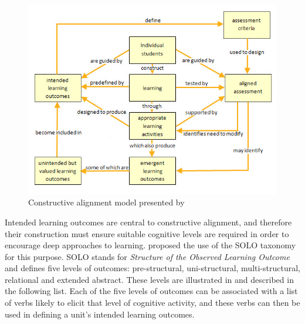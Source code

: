 \begin{figure}[htpb]
	\centering 
	\includegraphics[width=\columnwidth]{Houghton_constructive_alignment_1}
	\caption{Constructive alignment model presented by \citet{Houghton:2004}}
	\label{fig:Houghton}
\end{figure}

Intended learning outcomes are central to constructive alignment, and therefore their construction must ensure suitable cognitive levels are required in order to encourage deep approaches to learning. \citet{Biggs:1996c} proposed the use of the SOLO taxonomy \cite{Biggs:1982} for this purpose. SOLO stands for \emph{Structure of the Observed Learning Outcome} and defines five levels of outcomes: pre-structural, uni-structural, multi-structural, relational and extended abstract. These levels are illustrated in  and described in the following list. Each of the five levels of outcomes can be associated with a list of verbs likely to elicit that level of cognitive activity, and these verbs can then be used in defining a unit's intended learning outcomes.

